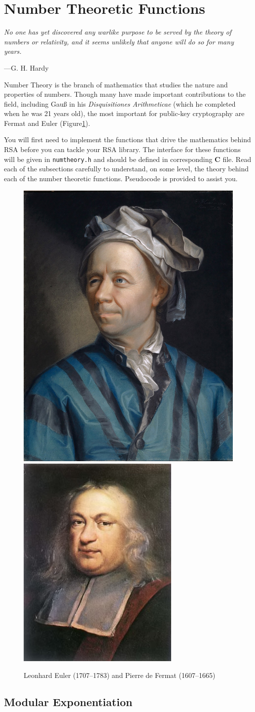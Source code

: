 \section{Number Theoretic Functions}
\epigraph{\emph{No one has yet discovered any warlike purpose to be served by the theory of numbers or relativity, and it seems unlikely that anyone will do so for many years.}}
{---G.\xspace H.\xspace Hardy}

\noindent
Number Theory is the branch of mathematics that studies the nature
and properties of numbers. Though many have made important contributions
to the field, including Gau{\ss} in his \emph{Disquisitiones
Arithmeticae} (which he completed when he was 21 years old), the
most important for public-key cryptography are Fermat and Euler
(Figure\xspace\ref{fig:euler}).

You will first need to implement the functions that drive the
mathematics behind RSA before you can tackle your RSA library. The
interface for these functions will be given in \texttt{numtheory.h} and
should be defined in corresponding \textbf{C} file. Read each of the subsections
carefully to understand, on some level, the theory behind each of the
number theoretic functions. Pseudocode is provided to assist you.

\begin{figure}[tbhp]
        \centering
        \includegraphics[height=0.23\textwidth]{./images/euler.jpg}\quad
        \includegraphics[height=0.23\textwidth]{./images/fermat.jpg}
        \caption{Leonhard Euler (1707--1783) and Pierre de Fermat (1607--1665)}\label{fig:euler}
\end{figure}
\subsection{Modular Exponentiation}

